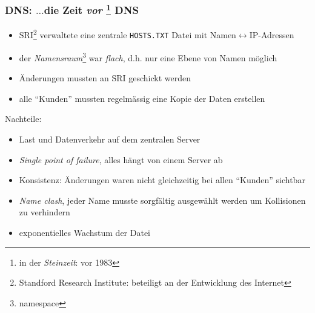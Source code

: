 \documentclass[ignorenonframetext]{beamer}
\begin{document}
\begin{frame}
\frametitle{DNS: $\ldots$die Zeit {\em vor}{ }\footnote{in der {\em Steinzeit}: vor 1983} DNS}
\begin{itemize}
	\item{SRI\footnote{Standford Research Institute: beteiligt an der Entwicklung des Internet} verwaltete eine zentrale \texttt{HOSTS.TXT} Datei mit Namen$\leftrightarrow$IP-Adressen}
	\item{der {\em Namensraum}{}\footnote{namespace} war {\em flach}, d.h. nur eine Ebene von Namen m\"oglich}
	\item{\"Anderungen mussten an SRI geschickt werden}
	\item{alle ``Kunden'' mussten regelm\"assig eine Kopie der Daten erstellen}
\end{itemize}
Nachteile:
\begin{itemize}
	\item{Last und Datenverkehr auf dem zentralen Server}
	\item{{\em Single point of failure}, alles h\"angt von einem Server ab}
	\item{Konsistenz: \"Anderungen waren nicht gleichzeitig bei allen ``Kunden'' sichtbar}
	\item{{\em Name clash}, jeder Name musste sorgf\"altig ausgew\"ahlt werden um Kollisionen zu verhindern}
	\item{exponentielles Wachstum der Datei}
\end{itemize}
\end{frame}
\end{document}
